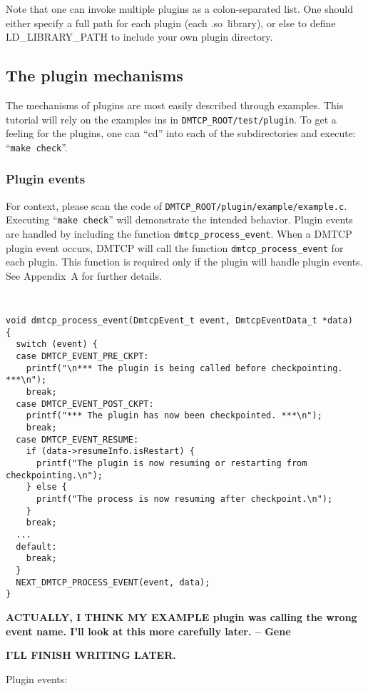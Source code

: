 \documentclass{article}
\begin{document}
Note that one can invoke multiple plugins as a colon-separated list.
One should either specify a full path for each plugin (each .so~library),
or else to define LD\_LIBRARY\_PATH to include your own plugin directory.

\subsection{The plugin mechanisms}

The mechanisms of plugins are most easily described through examples.
This tutorial will rely on the examples ins in {\tt DMTCP\_ROOT/test/plugin}.
To get a feeling for the plugins, one can ``cd'' into each of the
subdirectories and execute: ``{\tt make check}''.

\subsubsection{Plugin events}

For context, please scan the code of {\tt DMTCP\_ROOT/plugin/example/example.c}.
Executing ``{\tt make check}'' will demonstrate the intended behavior.
Plugin events are handled by including the function {\tt dmtcp\_process\_event}.
When a DMTCP plugin event occurs, DMTCP will call the
function {\tt dmtcp\_process\_event} for each plugin.
This function is required only if the plugin will handle plugin events.
See Appendix~A for further details.

{\tt
\begin{verbatim}
void dmtcp_process_event(DmtcpEvent_t event, DmtcpEventData_t *data)
{
  switch (event) {
  case DMTCP_EVENT_PRE_CKPT:
    printf("\n*** The plugin is being called before checkpointing. ***\n");
    break;
  case DMTCP_EVENT_POST_CKPT:
    printf("*** The plugin has now been checkpointed. ***\n");
    break;
  case DMTCP_EVENT_RESUME:
    if (data->resumeInfo.isRestart) {
      printf("The plugin is now resuming or restarting from checkpointing.\n");
    } else {
      printf("The process is now resuming after checkpoint.\n");
    }
    break;
  ...
  default:
    break;
  }
  NEXT_DMTCP_PROCESS_EVENT(event, data);
}
\end{verbatim}
}

{\bf ACTUALLY, I THINK MY
  EXAMPLE plugin was calling the wrong event name.  I'll look at this
  more carefully later. -- Gene}

{\bf I'LL FINISH WRITING LATER.}


Plugin events:
\end{document}
